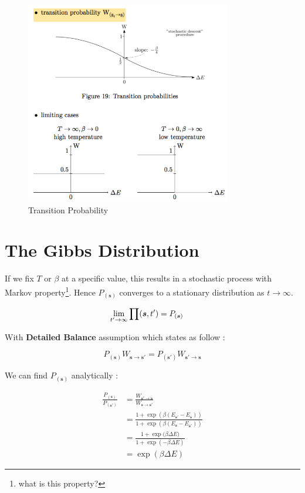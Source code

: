 \begin{figure}[hbt]
	\center
  \includegraphics[width=0.8\textwidth]{figures/so-transition-probability}
  \caption{Transition Probability}
  \label{fig:so-transition-probability}
\end{figure}


\section{The Gibbs Distribution}
If we fix $T$ or $\beta$ at a specific value,  this results in a stochastic process with Markov property\footnote{what is this property?}. Hence $P_{(\boldsymbol{s})}$ converges to a stationary distribution as $t \rightarrow \infty$.

$$
\lim_{t' \rightarrow \infty }  \prod(\boldsymbol{s}, t') = P_{(\boldsymbol{s})} \hspace{0.5cm}
$$

With \textbf{Detailed Balance} assumption which states as follow :

$$
P_{(\boldsymbol{s})} W_{\boldsymbol{s} \rightarrow \boldsymbol{s}' } = P_{(\boldsymbol{s}')} W_{\boldsymbol{s}' \rightarrow \boldsymbol{s} }
$$

We can find $P_{(\boldsymbol{s})} $ analytically : 

\begin{align*}
	\frac{P_{(\boldsymbol{s})}}{P_{(\boldsymbol{s}')}} &= \frac{W_{\boldsymbol{s}' \rightarrow \boldsymbol{s} }}{W_{\boldsymbol{s} \rightarrow \boldsymbol{s}' }} \\
	&= \frac{  1 + \exp{( \beta(E_{\boldsymbol{s}'} - E_{\boldsymbol{s}})   )} }{  1 + \exp{( \beta(E_{\boldsymbol{s}} - E_{\boldsymbol{s}'}) )  } } \\
	&= \frac{  1 + \exp{( \beta \Delta E} ) }{  1 + \exp{ (- \beta \Delta E)  } } \\
	&= \exp{( \beta \Delta E ) }
\end{align*}


